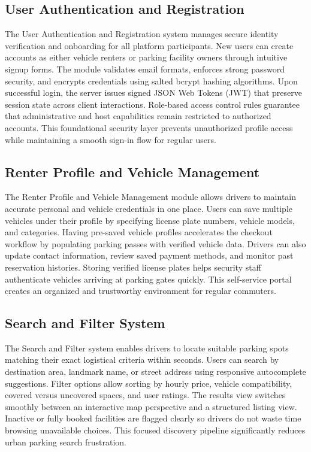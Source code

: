 \documentclass[12pt,a4paper]{article}
\begin{document}
\subsection{User Authentication and Registration}
The User Authentication and Registration system manages secure identity verification and onboarding for all platform participants. New users can create accounts as either vehicle renters or parking facility owners through intuitive signup forms. The module validates email formats, enforces strong password security, and encrypts credentials using salted bcrypt hashing algorithms. Upon successful login, the server issues signed JSON Web Tokens (JWT) that preserve session state across client interactions. Role-based access control rules guarantee that administrative and host capabilities remain restricted to authorized accounts. This foundational security layer prevents unauthorized profile access while maintaining a smooth sign-in flow for regular users.

\subsection{Renter Profile and Vehicle Management}
The Renter Profile and Vehicle Management module allows drivers to maintain accurate personal and vehicle credentials in one place. Users can save multiple vehicles under their profile by specifying license plate numbers, vehicle models, and categories. Having pre-saved vehicle profiles accelerates the checkout workflow by populating parking passes with verified vehicle data. Drivers can also update contact information, review saved payment methods, and monitor past reservation histories. Storing verified license plates helps security staff authenticate vehicles arriving at parking gates quickly. This self-service portal creates an organized and trustworthy environment for regular commuters.

\subsection{Search and Filter System}
The Search and Filter system enables drivers to locate suitable parking spots matching their exact logistical criteria within seconds. Users can search by destination area, landmark name, or street address using responsive autocomplete suggestions. Filter options allow sorting by hourly price, vehicle compatibility, covered versus uncovered spaces, and user ratings. The results view switches smoothly between an interactive map perspective and a structured listing view. Inactive or fully booked facilities are flagged clearly so drivers do not waste time browsing unavailable choices. This focused discovery pipeline significantly reduces urban parking search frustration.
\end{document}
